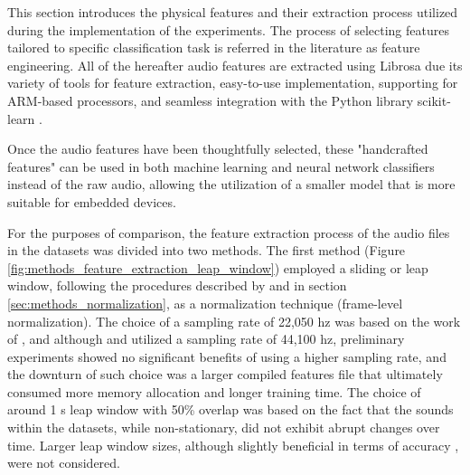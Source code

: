 This section introduces the physical features and their extraction process utilized during the implementation of the experiments. The process of selecting features tailored to specific classification task is referred in the literature as feature engineering. All of the hereafter audio features are extracted using Librosa \cite{McFee2015librosa_sw} due its variety of tools for feature extraction, easy-to-use implementation, supporting for ARM-based processors, and seamless integration with the Python library scikit-learn \cite{scikitle61}.

Once the audio features have been thoughtfully selected, these "handcrafted features" can be used in both machine learning and neural network classifiers instead of the raw audio, allowing the utilization of a smaller model that is more suitable for embedded devices.

For the purposes of comparison, the feature extraction process of the audio files in the datasets was divided into two methods. The first method (Figure \ref{fig:methods_feature_extraction_leap_window}) employed a sliding or leap window, following the procedures described by \textcite{Silva2019} and \textcite{Lhoest2021} in section \ref{sec:methods_normalization}, as a normalization technique (frame-level normalization). The choice of a sampling rate of 22,050 \gls{hz} was based on the work of \textcite{Salamon2017}, and although \textcite{PiczakESC2015} and \textcite{Bountourakis2015} utilized a sampling rate of 44,100 \gls{hz}, preliminary experiments showed no significant benefits of using a higher sampling rate, and the downturn of such choice was a larger compiled features file that ultimately consumed more memory allocation and longer training time. The choice of around 1 \gls{s} leap window with 50\% overlap was based on the fact that the sounds within the datasets, while non-stationary, did not exhibit abrupt changes over time. Larger leap window sizes, although slightly beneficial in terms of accuracy \cite{Salamon2017}, were not considered. 

